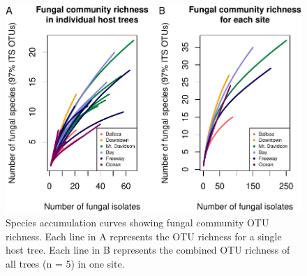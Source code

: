 \documentclass[fleqn,10pt,lineno]{wlpeerj} %
\begin{document}
\begin{figure}
\centering
\includegraphics{gibson2021_files/figure-latex/rarefaction-plot-1.pdf}
\caption{\label{fig:rarefaction-plot}Species accumulation curves showing fungal community OTU richness. Each line in A represents the OTU richness for a single host tree. Each line in B represents the combined OTU richness of all trees (n = 5) in one site.}
\end{figure}
\end{document}
